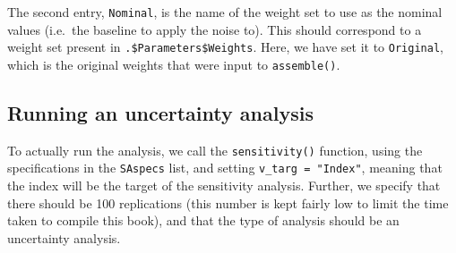 \documentclass[
]{book}
\begin{document}
The second entry, \texttt{Nominal}, is the name of the weight set to use as the nominal values (i.e.~the baseline to apply the noise to). This should correspond to a weight set present in \texttt{.\$Parameters\$Weights}. Here, we have set it to \texttt{Original}, which is the original weights that were input to \texttt{assemble()}.

\hypertarget{running-an-uncertainty-analysis}{%
\subsection{Running an uncertainty analysis}\label{running-an-uncertainty-analysis}}

To actually run the analysis, we call the \texttt{sensitivity()} function, using the specifications in the \texttt{SAspecs} list, and setting \texttt{v\_targ\ =\ "Index"}, meaning that the index will be the target of the sensitivity analysis. Further, we specify that there should be 100 replications (this number is kept fairly low to limit the time taken to compile this book), and that the type of analysis should be an uncertainty analysis.
\end{document}
